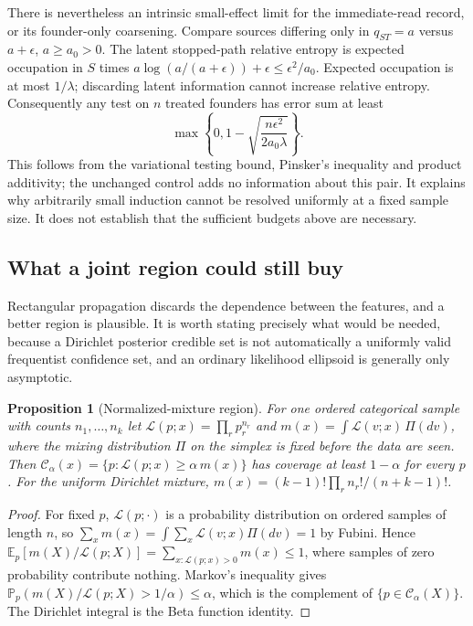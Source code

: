 \documentclass[11pt]{article}
\newtheorem{proposition}[theorem]{Proposition}
\theoremstyle{definition}
\newcommand{\E}{\mathbb E}
\newcommand{\Prob}{\mathbb P}
\begin{document}
There is nevertheless an intrinsic small-effect limit for the immediate-read
record, or its founder-only coarsening. Compare sources differing only in
$q_{ST}=a$ versus $a+\epsilon$, $a\ge a_0>0$. The latent stopped-path relative
entropy is expected occupation in $S$ times
$a\log(a/(a+\epsilon))+\epsilon\le\epsilon^2/a_0$. Expected occupation is at
most $1/\lambda$; discarding latent information cannot increase relative
entropy. Consequently any test on $n$ treated founders has error sum at least
\begin{equation}\label{eq:lower}
 \max\left\{0,1-\sqrt{\frac{n\epsilon^2}{2a_0\lambda}}\right\}.
\end{equation}
This follows from the variational testing bound, Pinsker's inequality and
product additivity; the unchanged control adds no information about this pair.
It explains why arbitrarily small induction cannot be resolved uniformly at a
fixed sample size. It does not establish that the sufficient budgets above are
necessary.

\subsection{What a joint region could still buy}\label{sec:joint}
Rectangular propagation discards the dependence between the features, and a
better region is plausible. It is worth stating precisely what would be needed,
because a Dirichlet posterior credible set is not automatically a uniformly
valid frequentist confidence set, and an ordinary likelihood ellipsoid is
generally only asymptotic.

\begin{proposition}[Normalized-mixture region]\label{prop:mixture}
For one ordered categorical sample with counts $n_1,\ldots,n_k$ let
$\mathcal L(p;x)=\prod_rp_r^{n_r}$ and $m(x)=\int\mathcal L(v;x)\,\Pi(dv)$, where
the mixing distribution $\Pi$ on the simplex is fixed before the data are seen.
Then $\mathcal C_\alpha(x)=\{p:\mathcal L(p;x)\ge\alpha\,m(x)\}$ has coverage at
least $1-\alpha$ for every $p$. For the uniform Dirichlet mixture,
$m(x)=(k-1)!\prod_rn_r!/(n+k-1)!$.
\end{proposition}
\begin{proof}
For fixed $p$, $\mathcal L(p;\cdot)$ is a probability distribution on ordered
samples of length $n$, so $\sum_x m(x)=\int\sum_x\mathcal L(v;x)\Pi(dv)=1$ by
Fubini. Hence $\E_p[m(X)/\mathcal L(p;X)]=\sum_{x:\mathcal L(p;x)>0}m(x)\le1$,
where samples of zero probability contribute nothing. Markov's inequality gives
$\Prob_p(m(X)/\mathcal L(p;X)>1/\alpha)\le\alpha$, which is the complement of
$\{p\in\mathcal C_\alpha(X)\}$. The Dirichlet integral is the Beta function
identity.
\end{proof}
\end{document}
